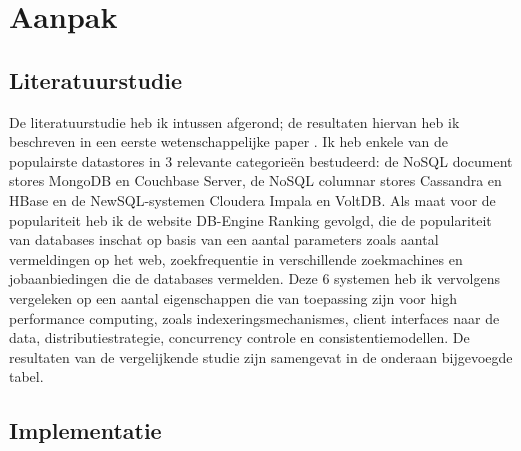 \documentclass{article}
\begin{document}
\section{Aanpak}

\subsection{Literatuurstudie}

De literatuurstudie heb ik intussen afgerond; de resultaten hiervan heb ik beschreven in een eerste wetenschappelijke paper \cite{gossele_survey}. Ik heb enkele van de populairste datastores in 3 relevante categorieën bestudeerd: de NoSQL document stores MongoDB en Couchbase Server, de NoSQL columnar stores Cassandra en HBase en de NewSQL-systemen Cloudera Impala en VoltDB. Als maat voor de populariteit heb ik de website DB-Engine Ranking \cite{db_engine_rank} gevolgd, die de populariteit van databases inschat op basis van een aantal parameters zoals aantal vermeldingen op het web, zoekfrequentie in verschillende zoekmachines en jobaanbiedingen die de databases vermelden. Deze 6 systemen heb ik vervolgens vergeleken op een aantal eigenschappen die van toepassing zijn voor high performance computing, zoals indexeringsmechanismes, client interfaces naar de data, distributiestrategie, concurrency controle en consistentiemodellen. De resultaten van de vergelijkende studie zijn samengevat in de onderaan bijgevoegde tabel.

\subsection{Implementatie}
\end{document}
